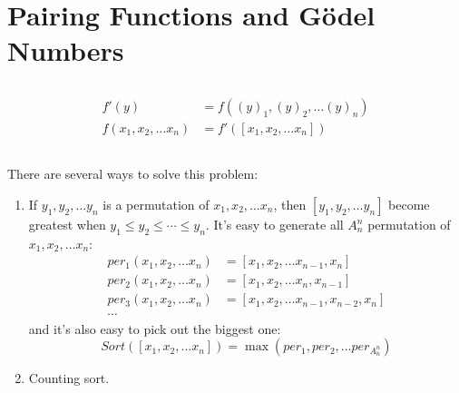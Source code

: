 \section{Pairing Functions and G\"odel Numbers}

\subsection{}
\begin{align*}
  f'(y) & = f((y)_{1},(y)_{2},\dots (y)_{n}) \\
  f(x_{1},x_{2},\dots x_{n}) & = f'([x_{1},x_{2},\dots x_{n}])
\end{align*}


\subsection{}
There are several ways to solve this problem:
\begin{enumerate}
  \item 
  If $ y_{1},y_{2},\dots y_{n} $ is a permutation of $ x_{1},x_{2},\dots x_{n} $,
  then $ [y_{1},y_{2},\dots y_{n}] $ become greatest when $ y_{1}\le y_{2}\le \cdots \le y_{n} $.
  It's easy to generate all $A_n^n$ permutation of $ x_{1},x_{2},\dots x_{n} $:
  \begin{align*}
    per_1(x_{1},x_{2},\dots x_{n}) & = [x_{1},x_{2},\dots x_{n-1},x_{n}] \\
    per_2(x_{1},x_{2},\dots x_{n}) & = [x_{1},x_{2},\dots x_{n},x_{n-1}] \\
    per_3(x_{1},x_{2},\dots x_{n}) & = [x_{1},x_{2},\dots x_{n-1},x_{n-2},x_{n}] \\
    \cdots
  \end{align*}
  and it's also easy to pick out the biggest one:
  \[ Sort([x_{1},x_{2},\dots x_{n}]) = \max(per_{1},per_{2},\dots per_{A_n^n}) \]
  
  \item Counting sort.
\end{enumerate}
